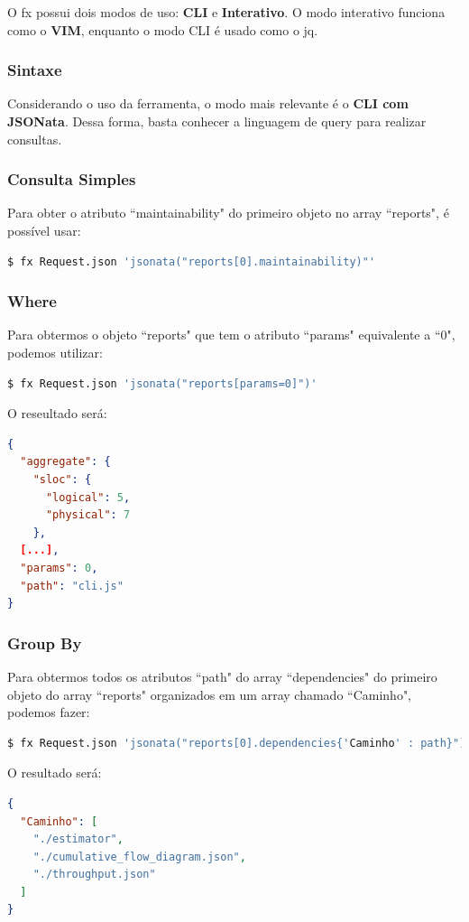 \documentclass[a4paper, 12pt] {article}
\begin{document}
				O fx possui dois modos de uso: \textbf{CLI} e \textbf{Interativo}. O modo interativo funciona como o \textbf{VIM}, enquanto o modo CLI é usado como o jq.
			\subsubsection{Sintaxe}
				Considerando o uso da ferramenta, o modo mais relevante é o \textbf{CLI com JSONata}. Dessa forma, basta conhecer a linguagem de query para realizar consultas.
			\subsubsection{Consulta Simples}
				Para obter o atributo “maintainability" do primeiro objeto no array “reports", é possível usar:
\begin{lstlisting}[language=bash]
$ fx Request.json 'jsonata("reports[0].maintainability)"'
\end{lstlisting}
			\subsubsection{Where}
				Para obtermos o objeto “reports" que tem o atributo “params" equivalente a “0", podemos utilizar:
\begin{lstlisting}[language=bash]
$ fx Request.json 'jsonata("reports[params=0]")'
\end{lstlisting}
				
				O reseultado será:
\begin{lstlisting}[language=json,firstnumber=1]
{
  "aggregate": {
    "sloc": {
      "logical": 5,
      "physical": 7
    },
  [...],
  "params": 0,
  "path": "cli.js"
}
\end{lstlisting}
			\subsubsection{Group By}
				Para obtermos todos os atributos “path" do array “dependencies" do primeiro objeto do array “reports" organizados em um array chamado “Caminho", podemos fazer:
\begin{lstlisting}[language=bash]
$ fx Request.json 'jsonata("reports[0].dependencies{'Caminho' : path}")'
\end{lstlisting}

				O resultado será:
\begin{lstlisting}[language=json,firstnumber=1]
{
  "Caminho": [
    "./estimator",
    "./cumulative_flow_diagram.json",
    "./throughput.json"
  ]
}
\end{lstlisting}
\end{document}
